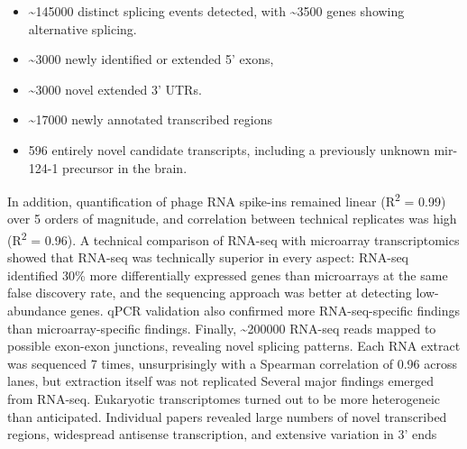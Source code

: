 \begin{itemize}[noitemsep]
	\item \textasciitilde{\num{145000}} distinct splicing events detected, with \textasciitilde{\num{3500}} genes showing alternative splicing.
	\item \textasciitilde{\num{3000}} newly identified or extended 5' exons,
	\item \textasciitilde{\num{3000}} novel extended 3' UTRs.
	\item \textasciitilde{\num{17000}} newly annotated transcribed regions
	\item \num{596} entirely novel candidate transcripts, including a previously unknown mir-124-1 precursor in the brain.
\end{itemize}

In addition, quantification of phage \textlambda{} RNA spike-ins remained linear (R\textsuperscript{2} = 0.99) over 5 orders of magnitude, and correlation between technical replicates was high (R\textsuperscript{2} = 0.96). A technical comparison of RNA-seq with microarray transcriptomics showed that RNA-seq was technically superior in every aspect: RNA-seq identified 30\% more differentially expressed genes than microarrays at the same false discovery rate, and the sequencing approach was better at detecting low-abundance genes. qPCR validation also confirmed more RNA-seq-specific findings than microarray-specific findings. Finally, \textasciitilde{\num{200000}} RNA-seq reads mapped to possible exon-exon junctions, revealing novel splicing patterns. Each RNA extract was sequenced 7 times, unsurprisingly with a Spearman correlation of 0.96 across lanes, but extraction itself was not replicated Several major findings emerged from RNA-seq. Eukaryotic transcriptomes turned out to be more heterogeneic than anticipated. Individual papers revealed large numbers of novel transcribed regions, widespread antisense transcription, and extensive variation in 3' ends



